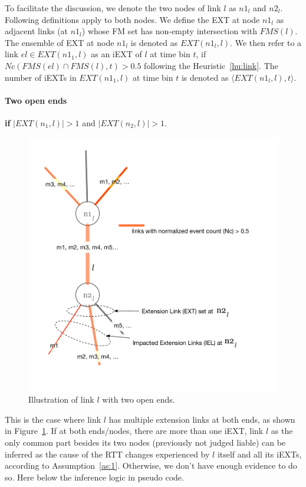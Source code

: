 To facilitate the discussion, we denote the two nodes of link $l$ as $n1_l$ and $n2_l$.
Following definitions apply to both nodes.
We define the \acf{EXT} at node $n1_l$ as adjacent links (at $n1_l$) whose \ac{FM} set has non-empty intersection with $FMS(l)$.
The ensemble of \ac{EXT} at node $n1_l$ is denoted as $EXT(n1_l, l)$.
We then refer to a link $el \in EXT(n1_1, l)$ as an \acf{iEXT} of $l$ at time bin $t$, if $Nc(FMS(el) \cap FMS(l), t) > 0.5$ following the Heuristic~\ref{hu:link}.
The number of \acp{iEXT} in $EXT(n1_1, l)$ at time bin $t$ is denoted as $\langle EXT(n1_l, l), t \rangle$. 


\paragraph{Two open ends} \textbf{if} $|EXT(n_1, l)| >1$ and $|EXT(n_2, l)| > 1$.

\begin{figure}[!htb]
\centering
\includegraphics[width=.9\textwidth]{gfx/chap5/two_open_ends.pdf}
\caption{Illustration of link $l$ with two open ends.}
\label{fig:chap5_two_open_ends}
\end{figure}

This is the case where link $l$ has multiple extension links at both ends, as shown in Figure~\ref{fig:chap5_two_open_ends}. 
If at both ends/nodes, there are more than one \ac{iEXT}, link $l$ as the only common part besides its two nodes (previously not judged liable) can be inferred as the cause of the RTT changes experienced by $l$ itself and all its \acp{iEXT}, according to Assumption~\ref{as:1}.
Otherwise, we don't have enough evidence to do so. Here below the inference logic in pseudo code.

